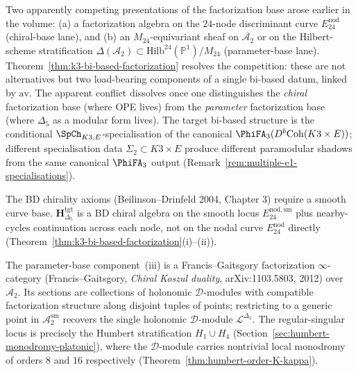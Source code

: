 \begin{remark}
\label{rem:bi-based-reconciliation}
Two apparently competing presentations of the factorization base arose earlier
in the volume: (a) a factorization algebra on the $24$-node discriminant curve
$E^{\mathrm{nod}}_{24}$ (chiral-base lane), and (b) an $M_{24}$-equivariant sheaf on
$\overline{\mathcal{A}_2}$ or on the Hilbert-scheme stratification
$\Delta(\mathcal{A}_2)\subset\mathrm{Hilb}^{24}(\mathbb{P}^1)/M_{24}$
(parameter-base lane). Theorem~\ref{thm:k3-bi-based-factorization} resolves the
competition: these are not alternatives but two load-bearing components of a single
bi-based datum, linked by $\mathrm{av}$. The apparent conflict dissolves once one
distinguishes the \emph{chiral} factorization base (where OPE lives) from the
\emph{parameter} factorization base (where $\Delta_5$ as a modular form lives).
The target bi-based structure is the conditional $\SpCh_{K3,E}$-specialisation of the canonical
$\PhiFA_3(D^b\mathrm{Coh}(K3\times E))$; different specialisation data
$\Sigma_2\subset K3\times E$ produce different paramodular shadows from the
same canonical $\PhiFA_3$ output
(Remark~\ref{rem:multiple-e1-specialisations}).
\end{remark}

\begin{remark}
\label{rem:BD-chiral-requires-smooth}
The BD chirality axioms (Beilinson--Drinfeld 2004, Chapter 3) require a
smooth curve base. $\mathbf{H}_{\Delta_5}^{\mathrm{tgt}}$ is a BD chiral algebra on the
smooth locus $E^{\mathrm{nod,sm}}_{24}$ plus nearby-cycles continuation
across each node, not on the nodal curve $E^{\mathrm{nod}}_{24}$ directly
(Theorem~\ref{thm:k3-bi-based-factorization}(i)--(ii)).
\end{remark}

\begin{remark}
\label{rem:FG-parameter-base-k3}
The parameter-base component~(iii) is a Francis--Gaitsgory factorization $\infty$-category (Francis--Gaitsgory, \emph{Chiral Koszul duality}, arXiv:1103.5803, 2012) over $\overline{\mathcal{A}_2}$. Its sections are collections of holonomic $\mathcal{D}$-modules with compatible factorization structure along disjoint tuples of points; restricting to a generic point in $\mathcal{A}_2^{\mathrm{sm}}$ recovers the single holonomic $\mathcal{D}$-module $\mathcal{L}^{\Delta_5}$. The regular-singular locus is precisely the Humbert stratification $H_1\cup H_4$ (Section~\ref{sec:humbert-monodromy-platonic}), where the $\mathcal{D}$-module carries nontrivial local monodromy of orders $8$ and $16$ respectively (Theorem~\ref{thm:humbert-order-K-kappa}).
\end{remark}

